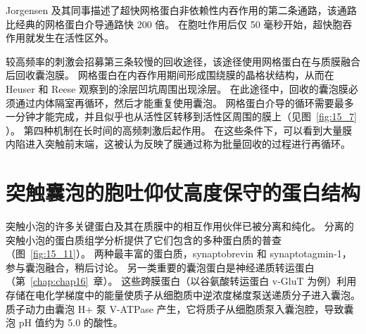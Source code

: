 Jorgensen 及其同事描述了超快网格蛋白非依赖性内吞作用的第二条通路，该通路比经典的网格蛋白介导通路快 200 倍。
在胞吐作用后仅 50 毫秒开始，超快胞吞作用就发生在活性区外。


较高频率的刺激会招募第三条较慢的回收途径，该途径使用网格蛋白在与质膜融合后回收囊泡膜。
网格蛋白在内吞作用期间形成围绕膜的晶格状结构，从而在 Heuser 和 Reese 观察到的涂层凹坑周围出现涂层。
在此途径中，回收的囊泡膜必须通过内体隔室再循环，然后才能重复使用囊泡。
网格蛋白介导的循环需要最多一分钟才能完成，并且似乎也从活性区转移到活性区周围的膜上（见图~\ref{fig:15_7} ）。 
第四种机制在长时间的高频刺激后起作用。
在这些条件下，可以看到大量膜内陷进入突触前末端，这被认为反映了膜通过称为批量回收的过程进行再循环。



\section{突触囊泡的胞吐仰仗高度保守的蛋白结构}

突触小泡的许多关键蛋白及其在质膜中的相互作用伙伴已被分离和纯化。
分离的突触小泡的蛋白质组学分析提供了它们包含的多种蛋白质的普查（图~\ref{fig:15_11}）。
两种最丰富的蛋白质，synaptobrevin 和 synaptotagmin-1，参与囊泡融合，稍后讨论。
另一类重要的囊泡蛋白是神经递质转运蛋白（第~\ref{chap:chap16}~章）。
这些跨膜蛋白（以谷氨酸转运蛋白 v-GluT 为例）利用存储在电化学梯度中的能量使质子从细胞质中逆浓度梯度泵送递质分子进入囊泡。
质子动力由囊泡 H+ 泵 V-ATPase 产生，它将质子从细胞质泵入囊泡腔，导致囊泡 pH 值约为 5.0 的酸性。



